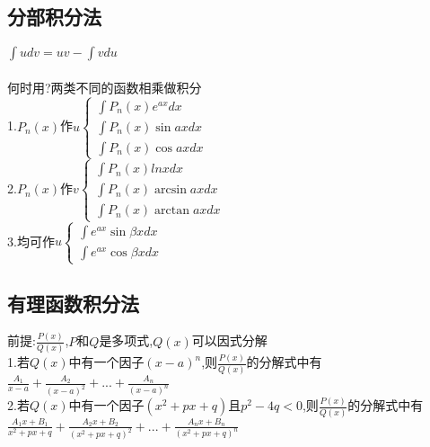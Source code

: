 \documentclass{article}
\begin{document}
\begin{flushleft}
	\subsection{分部积分法}
	
	$\int udv=uv-\int vdu$\\
	~\\
	何时用?两类不同的函数相乘做积分\\
	1.$P_n(x)$作$u \left\{
	\begin{array}{lcl}
	\int P_n(x)e^{ax}dx\\
	\int P_n(x)\sin axdx\\
	\int P_n(x)\cos axdx
	\end{array} \right.$\\
	2.$P_n(x)$作$v \left\{
	\begin{array}{lcl}
	\int P_n(x)lnxdx\\
	\int P_n(x)\arcsin axdx\\
	\int P_n(x)\arctan axdx
	\end{array} \right.$\\
	3.均可作$u \left\{
	\begin{array}{lcl}
	\int e^{ax}\sin \beta xdx\\
	\int e^{ax}\cos \beta xdx
	\end{array} \right.$\\
	
	\subsection{有理函数积分法}
	
	前提:$\frac{P(x)}{Q(x)}$,$P$和$Q$是多项式,$Q(x)$可以因式分解\\
	1.若$Q(x)$中有一个因子$(x-a)^n$,则$\frac{P(x)}{Q(x)}$的分解式中有$\frac{A_1}{x-a}+\frac{A_2}{(x-a)^2}+...+\frac{A_n}{(x-a)^n}$\\
	2.若$Q(x)$中有一个因子$(x^2+px+q)$且$p^2-4q<0$,则$\frac{P(x)}{Q(x)}$的分解式中有$\frac{A_1x+B_1}{x^2+px+q}+\frac{A_2x+B_2}{(x^2+px+q)^2}+...+\frac{A_nx+B_n}{(x^2+px+q)^n}$\\
\end{flushleft}
\end{document}
